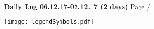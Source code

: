\noindent \large{\textbf{Daily Log 06.12.17-07.12.17 (2 days)}} \hfill \small{Page \thepage/\pageref{LastPage}}

\vspace{0.5em}
\centerline{\texttt{[image: legendSymbols.pdf]}}
\vspace{0.1em}